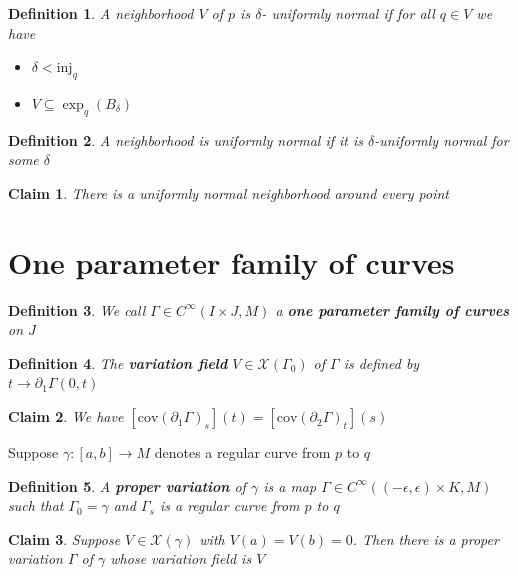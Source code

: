 \documentclass{article}
\newtheorem{definition}{Definition}
\newtheorem{claim}{Claim}
\begin{document}
\begin{definition}
  A neighborhood $V$ of $p$ is $\delta$- uniformly normal if for all $q \in V$ we have
  \begin{itemize}
    \item $\delta < \text{inj}_q$
    \item $V \subseteq \exp_q(B_\delta)$
  \end{itemize}
\end{definition}

\begin{definition}
  A neighborhood is uniformly normal if it is $\delta$-uniformly normal for some $\delta$
\end{definition}

\begin{claim}
  There is a uniformly normal neighborhood around every point
\end{claim}

\section{One parameter family of curves}

\begin{definition}
We call $\Gamma \in C^\infty(I \times J,M)$ a \textbf{one parameter family of curves} on $J$
\end{definition}

\begin{definition}
  The \textbf{variation field} $V \in \mathcal{X}(\Gamma_0)$ of $\Gamma$ is defined by $t \to \partial_1\Gamma(0,t)$
\end{definition}

\begin{claim}
  We have $[\text{cov}(\partial_1\Gamma)_s](t)=[\text{cov}(\partial_2\Gamma)_t](s)$
\end{claim}

Suppose $\gamma:[a,b] \to M$ denotes a regular curve from $p$ to $q$

\begin{definition}
	A \textbf{proper variation} of $\gamma$ is a map $\Gamma \in 
	C^{\infty}((-\epsilon,\epsilon) \times K,M)$ such that 
	$\Gamma_{0}=\gamma$ and $\Gamma_{s}$ is a regular curve from $p$ to $q$
\end{definition}

\begin{claim}
  Suppose $V \in \mathcal{X}(\gamma)$ with $V(a)=V(b)=0$. Then there is a proper variation $\Gamma$ of $\gamma$ whose variation field is $V$
\end{claim}
\end{document}
